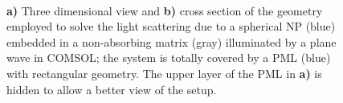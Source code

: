 \begin{figure}[b!]
	\centering
     \small
     \def\svgwidth{.8\textwidth}
     \hspace*{-.2\textwidth}
       \begin{subfigure}{.2\textwidth}\caption{ }\label{fig:setup:a}\end{subfigure}%
     \hspace*{-6em}%
       \begin{subfigure}{.78\textwidth}\caption{ }\label{fig:setup:b}\end{subfigure}
     \vspace*{-2.5em}\\
 \vspace*{0em}
\caption[Boxed Particle Setup in COMSOL]{\textbf{a)} Three dimensional view and \textbf{b)} cross section of the geometry employed to solve the light scattering due to a  spherical NP (blue) embedded in a non-absorbing matrix (gray) illuminated by a plane wave in COMSOL; the system is totally covered by a PML (blue) with rectangular geometry. The upper layer of the PML in \textbf{a)} is hidden to allow a better view of the setup.}
\label{fig:setup}
\end{figure}
%
